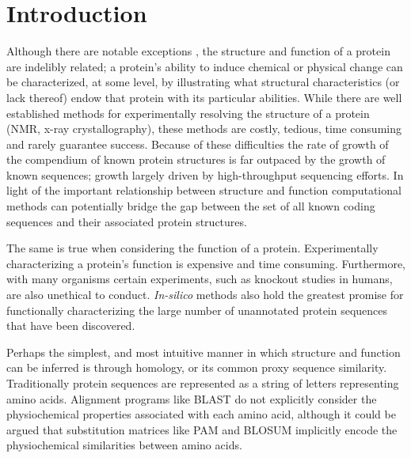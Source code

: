 \section{Introduction}

Although there are notable exceptions \citep{Dunker2001a,Dunker2001}, the structure and function of a protein  are indelibly related; a protein's ability to induce chemical or physical change can be characterized, at some level, by  illustrating what structural characteristics (or lack thereof) endow that protein with its particular abilities.  While there are well established methods for experimentally resolving the structure of a protein (NMR, x-ray crystallography), these methods are costly, tedious, time consuming and rarely guarantee success.  Because of these difficulties the rate of growth of the compendium of known protein structures is far outpaced by the growth of known sequences; growth largely driven by high-throughput sequencing efforts.  In light of the important relationship between structure and function computational methods can potentially bridge the gap between the set of all known coding sequences and their associated protein structures.


The same is true when considering the function of a protein.  Experimentally characterizing a protein's function is expensive and time consuming.  Furthermore, with many organisms certain experiments, such as knockout studies in humans, are also unethical to conduct.  \emph{In-silico} methods also hold the greatest promise for functionally characterizing the large number of unannotated protein sequences that have been discovered.

Perhaps the simplest, and most intuitive manner in which structure and function can be inferred is through homology, or its common proxy sequence similarity. Traditionally protein sequences are represented as a string of letters representing amino acids.  Alignment programs like BLAST \citep{Altschul1990} do not explicitly consider the physiochemical properties associated with each amino acid, although it could be argued that substitution matrices like PAM \citep{Dayhoff1978} and BLOSUM \citep{Henikoff1992} implicitly encode the physiochemical similarities between amino acids.  

